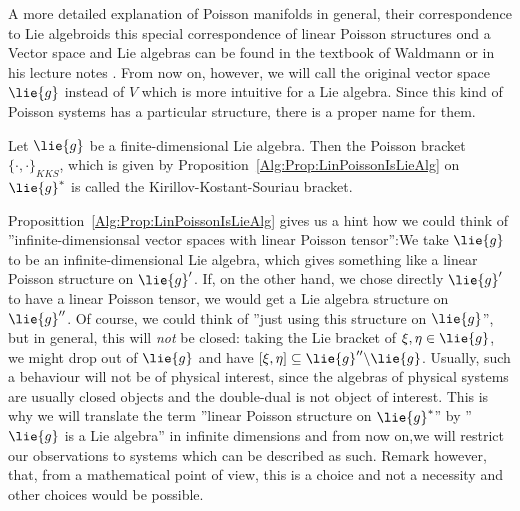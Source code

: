 A more detailed explanation of Poisson manifolds in general, their 
correspondence to Lie algebroids this special correspondence of linear Poisson 
structures ond a Vector space and Lie algebras can be found in the textbook of 
Waldmann \cite{waldmann:2007a} or in his lecture notes 
\cite{waldmann:2015a:script}. From now on, however, we will call the original 
vector space $\lie{g}$ instead of 
$V$ which is more intuitive for a Lie algebra. Since this kind of Poisson 
systems has a particular structure, there is a proper name for them.
\begin{definition}
	\label{Def:KKS}
	Let $\lie{g}$ be a finite-dimensional Lie algebra. Then the Poisson 
	bracket $\{ \cdot , \cdot \}_{KKS}$, which is given by 
	Proposition~\ref{Alg:Prop:LinPoissonIsLieAlg} on $\lie{g}^*$ is called 
	the Kirillov-Kostant-Souriau bracket.
\end{definition}



Proposittion~\ref{Alg:Prop:LinPoissonIsLieAlg} gives us a hint how we could
think of ''infinite-dimensionsal vector spaces with linear Poisson 
tensor'':We take $\lie{g}$ to be an infinite-dimensional Lie algebra, which 
gives something like a linear Poisson structure on $\lie{g}'$.
If, on the other hand, we chose directly $\lie{g}'$ to have a linear
Poisson tensor, we would get a Lie algebra structure on $\lie{g}''$.
Of course, we could think of ''just using this structure on $\lie{g}$'',
but in general, this will \emph{not} be closed: taking the Lie bracket of
$\xi, \eta \in \lie{g}$, we might drop out of $\lie{g}$ and have
$[\xi, \eta] \subseteq \lie{g}'' \backslash \lie{g}$. Usually, such
a behaviour will not be of physical interest, since the algebras of 
physical systems are usually closed objects and the double-dual is
not object of interest. This is why we will translate  the term
''linear Poisson structure on $\lie{g}^*$'' by  ''$\lie{g}$ is a Lie 
algebra'' in infinite dimensions and  from now on,we will restrict our 
observations to systems which can be described as such. Remark however, 
that, from a mathematical point of view, this is a choice and not a 
necessity and other choices would be possible.


